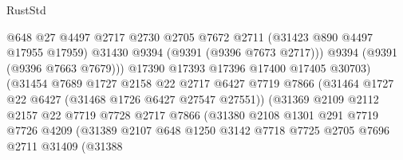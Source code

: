 \begin{lexlean}{RustStd}
\begin{coremodule}
                                      @648
                                      @27
                                      @4497
                                      @2717
                                      @2730
                                      @2705
                                      @7672
                                      @2711
                                      (@31423 @890 @4497 @17955 @17959)
                                      @31430
                                      @9394
                                      (@9391 (@9396 @7673 @2717)))
                                    @9394
                                    (@9391 (@9396 @7663 @7679)))
                                  @17390
                                  @17393
                                  @17396
                                  @17400
                                  @17405
                                  @30703)
                                (@31454
                                  @7689
                                  @1727
                                  @2158
                                  @22
                                  @2717
                                  @6427
                                  @7719
                                  @7866
                                  (@31464 @1727 @22 @6427 (@31468 @1726 @6427 @27547 @27551))
                                  (@31369
                                    @2109
                                    @2112
                                    @2157
                                    @22
                                    @7719
                                    @7728
                                    @2717
                                    @7866
                                    (@31380
                                      @2108
                                      @1301
                                      @291
                                      @7719
                                      @7726
                                      @4209
                                      (@31389
                                        @2107
                                        @648
                                        @1250
                                        @3142
                                        @7718
                                        @7725
                                        @2705
                                        @7696
                                        @2711
                                        @31409
                                        (@31388

\end{coremodule}
\end{lexlean}
